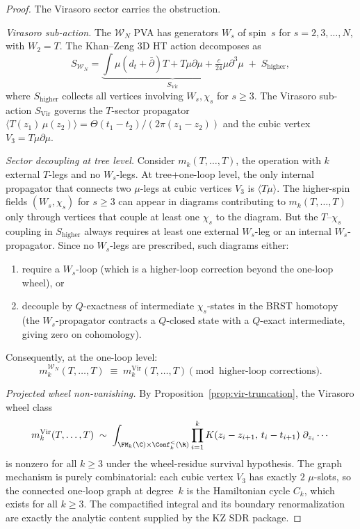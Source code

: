 \begin{proof}
The Virasoro sector carries the obstruction.

\medskip
\emph{Virasoro sub-action.}
The $\mathcal{W}_N$ PVA has generators $W_s$ of spin~$s$ for
$s = 2, 3, \ldots, N$, with $W_2 = T$. The Khan--Zeng 3D HT action
decomposes as
\[
S_{\mathcal{W}_N}
= \underbrace{\int \mu(d_t + \bar\partial)T + T\mu\partial\mu
 + \tfrac{c}{24}\mu\partial^3\mu}_{S_{\mathrm{Vir}}}
\;+\; S_{\mathrm{higher}},
\]
where $S_{\mathrm{higher}}$ collects all vertices involving
$W_s, \chi_s$ for $s \ge 3$. The Virasoro sub-action
$S_{\mathrm{Vir}}$ governs the $T$-sector propagator
$\langle T(z_1)\,\mu(z_2) \rangle = \Theta(t_1-t_2)/(2\pi(z_1-z_2))$
and the cubic vertex $V_3 = T\mu\partial\mu$.

\medskip
\emph{Sector decoupling at tree level.}
Consider $m_k(T, \ldots, T)$, the operation with $k$ external
$T$-legs and no $W_s$-legs. At tree+one-loop level, the only
internal propagator that connects two $\mu$-legs at cubic
vertices $V_3$ is $\langle T\mu \rangle$. The higher-spin fields
$(W_s, \chi_s)$ for $s \ge 3$ can appear in diagrams contributing
to $m_k(T, \ldots, T)$ only through vertices that couple at least
one $\chi_s$ to the diagram. But the $T$--$\chi_s$ coupling in
$S_{\mathrm{higher}}$ always requires at least one external
$W_s$-leg or an internal $W_s$-propagator. Since no $W_s$-legs
are prescribed, such diagrams either:
\begin{enumerate}[label=(\alph*)]
\item require a $W_s$-loop (which is a higher-loop correction
 beyond the one-loop wheel), or
\item decouple by $Q$-exactness of intermediate $\chi_s$-states
 in the BRST homotopy (the $W_s$-propagator contracts a
 $Q$-closed state with a $Q$-exact intermediate, giving zero
 on cohomology).
\end{enumerate}
Consequently, at the one-loop level:
\begin{equation}
\label{eq:wn-sector-decoupling}
m_k^{\mathcal{W}_N}(T, \ldots, T)
\;\equiv\; m_k^{\mathrm{Vir}}(T, \ldots, T)
\pmod{\text{higher-loop corrections}}.
\end{equation}

\medskip
\emph{Projected wheel non-vanishing.}
By Proposition~\ref{prop:vir-truncation}, the Virasoro wheel class
\[
m_k^{\mathrm{Vir}}(T, \ldots, T)
\;\sim\; \int_{\FM_k(\C) \times \Conf_k^{<}(\R)}
 \prod_{i=1}^k K(z_i - z_{i+1},\, t_i - t_{i+1})\;
 \partial_{z_i}\cdots
\]
is nonzero for all $k \ge 3$ under the wheel-residue survival
hypothesis. The graph mechanism is purely combinatorial: each cubic
vertex $V_3$ has exactly $2$ $\mu$-slots, so the connected one-loop
graph at degree~$k$ is the Hamiltonian cycle $C_k$, which exists for
all $k \ge 3$. The compactified integral and its boundary
renormalization are exactly the analytic content supplied by the KZ SDR
package.


\end{proof}
